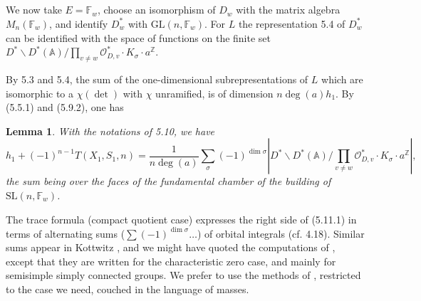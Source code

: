 \documentclass[11pt,a4paper]{article}
\theoremstyle{plain}
\newtheorem{lemma}[theorem]{Lemma}
\theoremstyle{definition}
\newcommand{\Z}{\mathbb{Z}}
\newcommand{\GL}{\mathrm{GL}}
\newcommand{\SL}{\mathrm{SL}}
\begin{document}
\subsection{}
We now take $E = \mathbb{F}_w$, choose an isomorphism of $D_w$ with the matrix algebra $M_n(\mathbb{F}_w)$, and identify $D_w^*$ with $\GL(n, \mathbb{F}_w)$. For $L$ the representation 5.4 of $D_w^*$ can be identified with the space of functions on the finite set $D^* \backslash D^*(\mathbb{A}) / \prod_{v \neq w} \mathcal{O}_{D,v}^* \cdot K_\sigma \cdot a^{\Z}$.

By 5.3 and 5.4, the sum of the one-dimensional subrepresentations of $L$ which are isomorphic to a $\chi(\det)$ with $\chi$ unramified, is of dimension $n\deg(a) h_1$. By (5.5.1) and (5.9.2), one has

\begin{lemma}
With the notations of 5.10, we have
\begin{equation}
h_1 + (-1)^{n-1} T(X_1, S_1, n) = \frac{1}{n\deg(a)} \sum_\sigma (-1)^{\dim \sigma} |D^* \backslash D^*(\mathbb{A}) / \prod_{v \neq w} \mathcal{O}_{D,v}^* \cdot K_\sigma \cdot a^{\Z}|, \tag{5.11.1}
\end{equation}
the sum being over the faces of the fundamental chamber of the building of $\SL(n, \mathbb{F}_w)$.
\end{lemma}

The trace formula (compact quotient case) expresses the right side of (5.11.1) in terms of alternating sums ($\sum (-1)^{\dim \sigma} \ldots$) of orbital integrals (cf. 4.18). Similar sums appear in Kottwitz \cite{K}, and we might have quoted the computations of \cite{K}, except that they are written for the characteristic zero case, and mainly for semisimple simply connected groups. We prefer to use the methods of \cite{K}, restricted to the case we need, couched in the language of masses.
\end{document}
